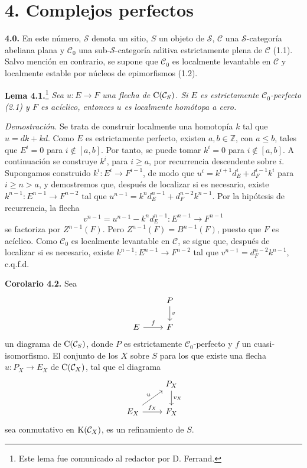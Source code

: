 
\providecommand{\sisi}[2]{#2}

\section*{4. Complejos perfectos}

\textbf{4.0.} En este número, \(\sisi{S}{\mathcal S}\) denota un sitio, \(S\) un objeto de \(\sisi{S}{\mathcal S}\), \(\mathcal C\) una \(\sisi{S}{\mathcal S}\)-categoría abeliana plana y \(\mathcal C_0\) una sub-\(\sisi{S}{\mathcal S}\)-categoría aditiva estrictamente plena de \(\mathcal C\) (1.1). Salvo mención en contrario, se supone que \(\mathcal C_0\) es localmente levantable en \(\mathcal C\) y localmente estable por núcleos de epimorfismos (1.2).

\textbf{Lema 4.1.}\footnote{Este lema fue comunicado al redactor por D. Ferrand.} \emph{Sea \(u:E\to F\) una flecha de \(\mathrm C(\mathcal C_S)\). Si \(E\) es estrictamente \(\mathcal C_0\)-perfecto (2.1) y \(F\) es acíclico, entonces \(u\) es localmente homótopa a cero.}

\emph{Demostración.} Se trata de construir localmente una homotopía \(k\) tal que \(u=dk+kd\). Como \(E\) es estrictamente perfecto, existen \(a,b\in\mathbb Z\), con \(a\leq b\), tales que \(E^i=0\) para \(i\notin[a,b]\). Por tanto, se puede tomar \(k^i=0\) para \(i\notin[a,b]\). A continuación se construye \(k^i\), para \(i\geq a\), por recurrencia descendente sobre \(i\). Supongamos construido \(k^i:E^i\to F^{i-1}\), de modo que \(u^i=k^{i+1}d_E^i+d_F^{i-1}k^i\) para \(i\geq n>a\), y demostremos que, después de localizar si es necesario, existe \(k^{n-1}:E^{n-1}\to F^{n-2}\) tal que \(u^{n-1}=k^nd_E^{n-1}+d_F^{n-2}k^{n-1}\). Por la hipótesis de recurrencia, la flecha
\[
  v^{n-1}=u^{n-1}-k^nd_E^{n-1}:E^{n-1}\to F^{n-1}
\]
se factoriza por \(Z^{n-1}(F)\). Pero \(Z^{n-1}(F)=B^{n-1}(F)\), puesto que \(F\) es acíclico. Como \(\mathcal C_0\) es localmente levantable en \(\mathcal C\), se sigue que, después de localizar si es necesario, existe \(k^{n-1}:E^{n-1}\to F^{n-2}\) tal que \(v^{n-1}=d_F^{n-2}k^{n-1}\), c.q.f.d.

\textbf{Corolario 4.2.} Sea
\[
\begin{tikzcd}
& P \arrow[d,"v"] \\
E \arrow[r,"f"] & F
\end{tikzcd}
\]
un diagrama de \(\mathrm C(\mathcal C_S)\), donde \(P\) es estrictamente \(\mathcal C_0\)-perfecto y \(f\) un cuasi-isomorfismo. El conjunto de los \(X\) sobre \(S\) para los que existe una flecha \(u:P_X\to E_X\) de \(\mathrm C(\mathcal C_X)\), tal que el diagrama
\[
\begin{tikzcd}
& P_X \arrow[d,"v_X"]\\
E_X \arrow[r,"f_X"] \arrow[ur,"u"] & F_X
\end{tikzcd}
\]
sea conmutativo en \(\mathrm K(\mathcal C_X)\), es un refinamiento de \(S\).


